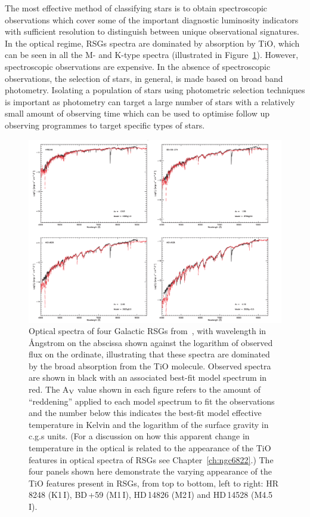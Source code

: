 The most effective method of classifying stars is to obtain spectroscopic observations which cover some of the important diagnostic luminosity indicators with sufficient resolution to distinguish between unique observational signatures.
In the optical regime, RSGs spectra are dominated by absorption by TiO, which can be seen in all the M- and K-type spectra (illustrated in Figure~\ref{fig:RSGoptical}).
However, spectroscopic observations are expensive.
In the absence of spectroscopic observations, the selection of stars, in general, is made based on broad band photometry.
Isolating a population of stars using photometric selection techniques is important as photometry can target a large number of stars with a relatively small amount of observing time which can be used to optimise follow up observing programmes to target specific types of stars.

 \begin{figure}
 \centering
 \includegraphics[width=\textwidth]{intro/Levesque_Fig1}
 \caption[Optical spectra of four RSGs from~\citeauthor{Levesque05}]{Optical spectra of four Galactic RSGs from~\cite{Levesque05}, with wavelength in \AA ngstrom on the abscissa shown against the logarithm of observed flux on the ordinate, illustrating that these spectra are dominated by the broad absorption from the TiO molecule.
 Observed spectra are shown in black with an associated best-fit model spectrum in red.
 The A$_{\rm V}$ value shown in each figure refers to the amount of ``reddening'' applied to each model spectrum to fit the observations and the number below this indicates the best-fit model effective temperature in Kelvin and the logarithm of the surface gravity in c.g.s units. (For a discussion on how this apparent change in temperature in the optical is related to the appearance of the TiO features in optical spectra of RSGs see Chapter~\ref{ch:ngc6822}.)
 The four panels shown here demonstrate the varying appearance of the TiO features present in RSGs, from top to bottom, left to right:
 HR\,8248 (K1\,I),
 BD\,+59 (M1\,I),
 HD\,14826 (M2\,I) and
 HD\,14528 (M4.5\,I).
 \label{fig:RSGoptical}}
\end{figure}

